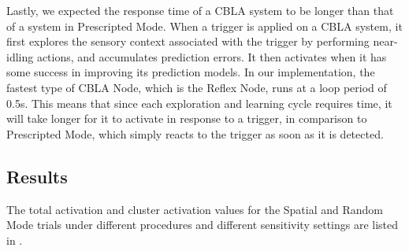 Lastly, we expected the response time of a CBLA system to be longer than that of a system in Prescripted Mode. When a trigger is applied on a CBLA system, it first explores the sensory context associated with the trigger by performing near-idling actions, and accumulates prediction errors. It then activates when it has some success in improving its prediction models. In our implementation, the fastest type of CBLA Node, which is the Reflex Node, runs at a loop period of 0.5s. This means that since each exploration and learning cycle requires time, it will take longer for it to activate in response to a trigger, in comparison to Prescripted Mode, which simply reacts to the trigger as soon as it is detected.


\subsection{Results}

The total activation and cluster activation values for the Spatial and Random Mode trials under different procedures and different sensitivity settings are listed in . 

